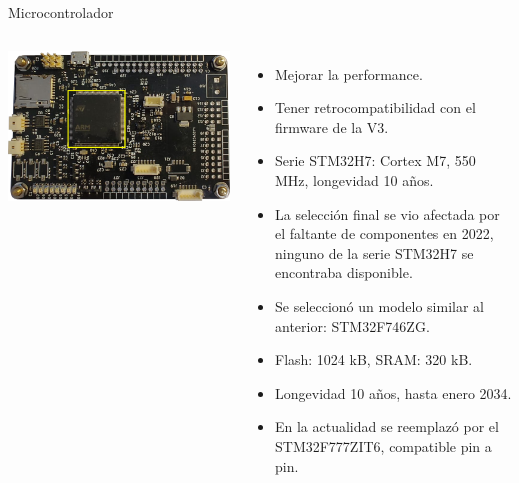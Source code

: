 \begin{frame}{Microcontrolador}
	\begin{columns}
			\begin{center}
				\includegraphics[width=\textwidth]{img/microcontrolador.png}
			\end{center}
			\begin{itemize}
				\item<2-> Mejorar la performance.
				\item<3-> Tener retrocompatibilidad con el firmware de la V3.
				\item<4-> Serie STM32H7: Cortex M7, 550 MHz, longevidad 10 años.
				\item<5-> La selección final se vio afectada por el faltante de componentes en 2022, ninguno de la serie STM32H7 se encontraba disponible.
				\item<6-> Se seleccionó un modelo similar al anterior: STM32F746ZG.
				\item<7-> Flash: 1024 kB, SRAM: 320 kB.
 				\item<7-> Longevidad 10 años, hasta enero 2034.
 				\item<7-> En la actualidad se reemplazó por el STM32F777ZIT6, compatible pin a pin.
				\end{itemize}
	\end{columns}
\end{frame}

